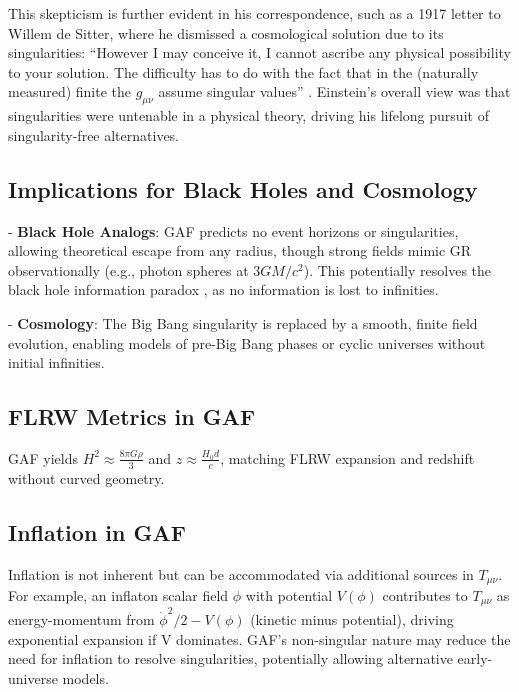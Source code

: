 \documentclass{article}
\begin{document}
This skepticism is further evident in his correspondence, such as a 1917 letter to Willem de Sitter, where he dismissed a cosmological solution due to its singularities: ``However I may conceive it, I cannot ascribe any physical possibility to your solution. The difficulty has to do with the fact that in the (naturally measured) finite the $g_{\mu\nu}$ assume singular values'' \cite{EinsteinDeSitter1917}. Einstein's overall view was that singularities were untenable in a physical theory, driving his lifelong pursuit of singularity-free alternatives.

\subsection{Implications for Black Holes and Cosmology}

- \textbf{Black Hole Analogs}: GAF predicts no event horizons or singularities, allowing theoretical escape from any radius, though strong fields mimic GR observationally (e.g., photon spheres at \( 3GM/c^2 \)). This potentially resolves the black hole information paradox \cite{Hawking1976}, as no information is lost to infinities.

- \textbf{Cosmology}: The Big Bang singularity is replaced by a smooth, finite field evolution, enabling models of pre-Big Bang phases or cyclic universes without initial infinities.

\subsection{FLRW Metrics in GAF}

GAF yields \( H^2 \approx \frac{8 \pi G \rho}{3} \) and \( z \approx \frac{H_0 d}{c} \), matching FLRW expansion and redshift without curved geometry.

\subsection{Inflation in GAF}

Inflation is not inherent but can be accommodated via additional sources in \( T_{\mu\nu} \). For example, an inflaton scalar field \(\phi\) with potential \(V(\phi)\) contributes to \( T_{\mu\nu} \) as energy-momentum from \(\dot{\phi}^2 / 2 - V(\phi)\) (kinetic minus potential), driving exponential expansion if V dominates. GAF's non-singular nature may reduce the need for inflation to resolve singularities, potentially allowing alternative early-universe models.
\end{document}

